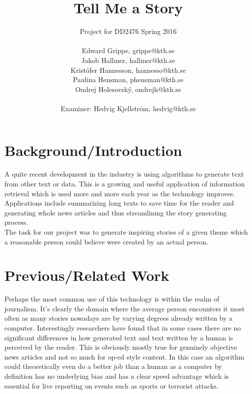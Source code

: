 \documentclass[12pt,a4paper,utf8]{article}
\title{Tell Me a Story}
\author{Project for DD2476 Spring 2016\\\\Edward Grippe, grippe@kth.se\\Jakob Hallmer, hallmer@kth.se\\Kristófer Hannesson, hannesso@kth.se\\Paulina Hensman, phensman@kth.se\\Ondrej Holesovský, ondrejh@kth.se\\\\ Examiner: Hedvig Kjellström, hedvig@kth.se}
\begin{document}
\maketitle
\thispagestyle{empty}
\clearpage


\begin{abstract}
\lipsum[1]
\end{abstract}
\pagebreak


\pagestyle{plain}
\tableofcontents
\cleardoublepage
\pagebreak




\setcounter{page}{1}
\setcounter{secnumdepth}{3}

\section{Background/Introduction}
A quite recent development in the industry is using algorithms to generate text from other text or data. This is a growing and useful application of information retrieval which is used more and more each year as the technology improves. Applications include summarizing long texts to save time for the reader and generating whole news articles and thus streamlining the story generating process\autocite{RobotJournalist}.\\

The task for our project was to generate inspiring stories of a given theme which a reasonable person could believe were created by an actual person.

\section{Previous/Related Work}
Perhaps the most common use of this technology is within the realm of journalism. It's clearly the domain where the average person encounters it most often as many stories nowadays are by varying degrees already written by a computer. Interestingly researchers have found that in some cases there are no significant differences in how generated text and text written by a human is perceived by the reader\autocite{RobotJournalist}. This is obviously mostly true for genuinely objective news articles and not so much for op-ed style content. In this case an algorithm could theoretically even do a better job than a human as a computer by definition has no underlying bias and has a clear speed advantage which is essential for live reporting on events such as sports or terrorist attacks.\\
\end{document}
